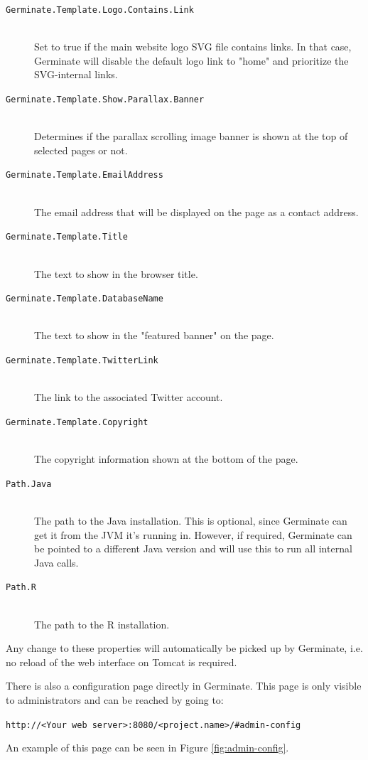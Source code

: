 \begin{description}
    \item[\texttt{Germinate.Template.Logo.Contains.Link}] \\Set to true if the main website logo SVG file contains links. In that case, Germinate will disable the default logo link to "home" and prioritize the SVG-internal links.
    \item[\texttt{Germinate.Template.Show.Parallax.Banner}] \\Determines if the parallax scrolling image banner is shown at the top of selected pages or not.
    \item[\texttt{Germinate.Template.EmailAddress}] \floatright{[E-Mail]}\\The email address that will be displayed on the page as a contact address.    
    \item[\texttt{Germinate.Template.Title}] \floatright{[String]}\\The text to show in the browser title.
    \item[\texttt{Germinate.Template.DatabaseName}] \floatright{[String]}\\The text to show in the "featured banner" on the page.
    \item[\texttt{Germinate.Template.TwitterLink}] \floatright{[URL]}\\The link to the associated Twitter account.
    \item[\texttt{Germinate.Template.Copyright}] \floatright{[String]}\\The copyright information shown at the bottom of the page.
    \item[\texttt{Path.Java}] \floatright{[String]}\\The path to the Java installation. This is optional, since Germinate can get it from the JVM it's running in. However, if required, Germinate can be pointed to a different Java version and will use this to run all internal Java calls.
    \item[\texttt{Path.R}\nonoptionalif] \floatright{[String]}\\The path to the R installation.
\end{description}
\noindent
Any change to these properties will automatically be picked up by Germinate, i.e. no reload of the web interface on Tomcat is required.

There is also a configuration page directly in Germinate. This page is only visible to administrators and can be reached by going to:
\begin{center}
	\texttt{http://<Your web server>:8080/<project.name>/\#admin-config}
\end{center}
\noindent An example of this page can be seen in Figure \ref{fig:admin-config}.


